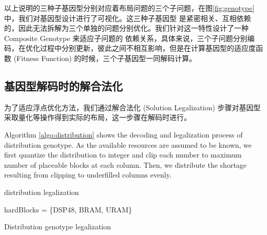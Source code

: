 以上说明的三种子基因型分别对应着布局问题的三个子问题，在图\ref{fig:genotype}中，我们对基因型设计进行了可视化。这三种子基因型
是紧密相关、互相依赖的，因此无法拆解为三个单独的问题分别优化。我们针对这一特性设计了一种 Composite Genotype 来适应子问题的
依赖关系，具体来说，三个子问题分别编码，在优化过程中分别更新，彼此之间不相互影响，但是在计算基因型的适应度函数 (Fitness Function)
的时候，三个子基因型一同解码计算。


\subsection{基因型解码时的解合法化}

为了适应浮点优化方法，我们通过解合法化 (Solution Legalization) 步骤对基因型采取量化等操作得到实际的布局，这一步骤在解码时进行。

Algorithm \ref{algo:distribution} shows the decoding and legalization process of distribution genotype. 
As the available resources are assumed to be known, we first quantize the
distribution to integer and clip each number to maximum number of placeable
blocks at each column. Then, we distribute the shortage resulting from clipping to underfilled columns evenly. 

distribution legalization
\begin{algorithm}
	
	hardBlocks = \{DSP48, BRAM, URAM\}\;

	\caption{Distribution genotype legalization}
	\label{algo:distribution}
\end{algorithm}

